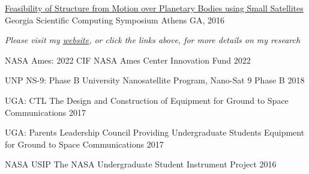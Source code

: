 \documentclass[10pt,a4paper]{article}
\begin{document}
\headedsection
  {{\color{bluegreen} \faMapO} \href{http://smallsat.uga.edu/images/documents/posters/2017-GeorgiaScientificComputingSymposium\%20final.pdf}{Feasibility of Structure from Motion over Planetary Bodies using Small Satellites}}{%
  \headedsubsection
    {Georgia Scientific Computing Symposium}
    {Athens GA, 2016}
    {}
}

\begin{center}
  \emph{\small Please visit my \href{http://calebadams.space}{website}, or click the links above, for more details on my research}
\end{center}


\spacedhrule{0.5em}{-0.4em}

\vspace{-0.2em}


\headedsection
  {{NASA Ames: 2022 CIF}}
  {%
  \headedsubsection
    {NASA Ames Center Innovation Fund}
    {2022}
    {}
}

\headedsection
  {{UNP NS-9: Phase B}}
  {%
  \headedsubsection
    {University Nanosatellite Program, Nano-Sat 9 Phase B}
    {2018}
    {}
}

\headedsection
  {{UGA: CTL}}
  {%
  \headedsubsection
    {The Design and Construction of Equipment for Ground to Space Communications}
    {2017}
    {}
}

\headedsection
  {{UGA: Parents Leadership Council }}
  {%
  \headedsubsection
    {Providing Undergraduate Students Equipment for Ground to Space Communications}
    {2017}
    {}
}

\headedsection
  {{NASA USIP}}
  {%
  \headedsubsection
    {The NASA Undergraduate Student Instrument Project}
    {2016}
    {}
}
\end{document}
